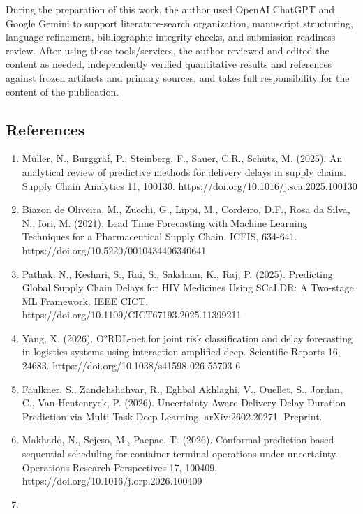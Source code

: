 \documentclass[
]{article}
\providecommand{\tightlist}{%
  \setlength{\itemsep}{0pt}\setlength{\parskip}{0pt}}
\begin{document}
During the preparation of this work, the author used OpenAI ChatGPT and
Google Gemini to support literature-search organization, manuscript
structuring, language refinement, bibliographic integrity checks, and
submission-readiness review. After using these tools/services, the author
reviewed and edited the content as needed, independently verified
quantitative results and references against frozen artifacts and primary
sources, and takes full responsibility for the content of the publication.

\subsection{References}\label{references}

\begin{enumerate}
\def\labelenumi{\arabic{enumi}.}
\tightlist
\item
  Müller, N., Burggräf, P., Steinberg, F., Sauer, C.R., Schütz, M.
  (2025). An analytical review of predictive methods for delivery delays
  in supply chains. Supply Chain Analytics 11, 100130.
  https://doi.org/10.1016/j.sca.2025.100130
\item
  Biazon de Oliveira, M., Zucchi, G., Lippi, M., Cordeiro, D.F., Rosa da
  Silva, N., Iori, M. (2021). Lead Time Forecasting with Machine
  Learning Techniques for a Pharmaceutical Supply Chain. ICEIS, 634-641.
  https://doi.org/10.5220/0010434406340641
\item
  Pathak, N., Keshari, S., Rai, S., Saksham, K., Raj, P. (2025).
  Predicting Global Supply Chain Delays for HIV Medicines Using SCaLDR:
  A Two-stage ML Framework. IEEE CICT.
  https://doi.org/10.1109/CICT67193.2025.11399211
\item
  Yang, X. (2026). O²RDL-net for joint risk classification and delay
  forecasting in logistics systems using interaction amplified deep.
  Scientific Reports 16, 24683.
  https://doi.org/10.1038/s41598-026-55703-6
\item
  Faulkner, S., Zandehshahvar, R., Eghbal Akhlaghi, V., Ouellet, S.,
  Jordan, C., Van Hentenryck, P. (2026). Uncertainty-Aware Delivery
  Delay Duration Prediction via Multi-Task Deep Learning.
  arXiv:2602.20271. Preprint.
\item
  Makhado, N., Sejeso, M., Paepae, T. (2026). Conformal prediction-based
  sequential scheduling for container terminal operations under
  uncertainty. Operations Research Perspectives 17, 100409.
  https://doi.org/10.1016/j.orp.2026.100409
\item

\end{enumerate}
\end{document}
